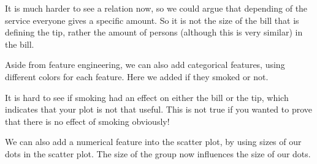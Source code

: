 \documentclass[letterpaper,10pt,english]{jupyterBook}
\begin{document}
\begin{sphinxVerbatim}[commandchars=\\\{\}]
\PYG{p}{[}\PYG{p}{]}  \PYG{p}{[}\PYG{p}{]}
    
\end{sphinxVerbatim}

\noindent{}

\sphinxAtStartPar
It is much harder to see a relation now, so we could argue that depending of the service everyone gives a specific amount.
So it is not the size of the bill that is defining the tip, rather the amount of persons (although this is very similar) in the bill.

\sphinxAtStartPar
Aside from feature engineering, we can also add categorical features, using different colors for each feature.
Here we added if they smoked or not.

\begin{sphinxVerbatim}[commandchars=\\\{\}]
     
\end{sphinxVerbatim}

\noindent{}

\sphinxAtStartPar
It is hard to see if smoking had an effect on either the bill or the tip, which indicates that your plot is not that useful.
This is not true if you wanted to prove that there is no effect of smoking obviously!

\sphinxAtStartPar
We can also add a numerical feature into the scatter plot, by using sizes of our dots in the scatter plot.
The size of the group now influences the size of our dots.
\end{document}
